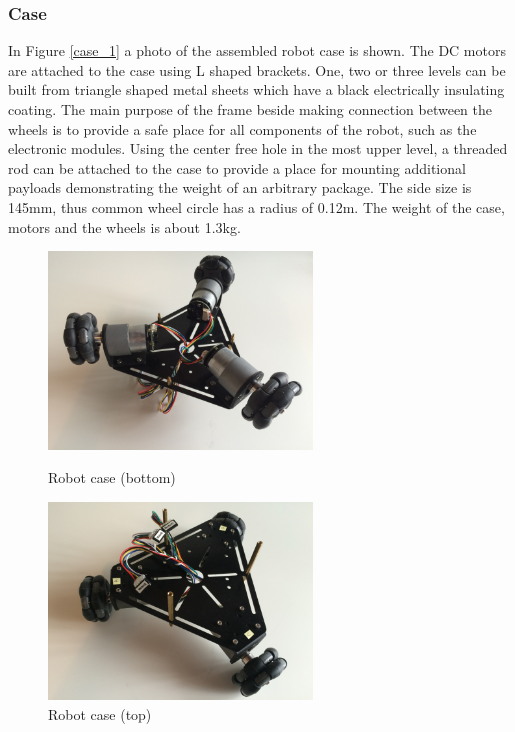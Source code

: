 \documentclass[12pt,english]{article}
\begin{document}
\subsubsection{Case}
In Figure \ref{case_1} a photo of the assembled robot case is shown. The DC motors are attached to the case using L shaped brackets. One, two or three levels can be built from triangle shaped metal sheets which have a black electrically insulating coating. The main purpose of the frame beside making connection between the wheels is to provide a safe place for all components of the robot, such as the electronic modules. Using the center free hole in the most upper level, a threaded rod can be attached to the case to provide a place for mounting additional payloads demonstrating the weight of an arbitrary package. The side size is 145mm, thus common wheel circle has a radius of 0.12m. The weight of the case, motors and the wheels is about 1.3kg.
\begin{figure}[htb!]
	\centering
	\centering
	\includegraphics[width=7cm]{figures/case_1}
	\caption{Robot case (bottom)}
	\label{case_1}
	\endminipage\hfill
	\centering
	\includegraphics[width=7cm]{figures/case_2}
	\caption{Robot case (top)}
	\label{case_2}
	\endminipage\hfill
\end{figure}
\end{document}

